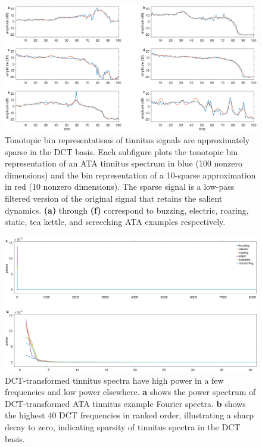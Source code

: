 \documentclass[journal]{IEEEtran}
\begin{document}
\begin{figure}[h]
	\centering
	\includegraphics[width=\linewidth]{gfx/target_signal_sparsity_2.eps}
	\caption{Tonotopic bin representations of tinnitus signals are approximately sparse
    in the DCT basis.
    Each subfigure plots the tonotopic bin representation of an ATA tinnitus spectrum
    in blue (100 nonzero dimensions) and the bin representation of a 10-sparse
    approximation in red (10 nonzero dimensions).
    The sparse signal is a low-pass filtered version of the original signal
    that retains the salient dynamics.
    \textbf{(a)} through \textbf{(f)} correspond to
    buzzing, electric, roaring, static, tea kettle, and screeching ATA examples
    respectively.}
	\label{fig:target_signal_sparsity_2}
\end{figure}

\begin{figure}[h]
	\centering
	\includegraphics[width=\linewidth]{gfx/target_signal_sparsity_3.eps}
	\caption{DCT-transformed tinnitus spectra have high power in a few frequencies
  and low power elsewhere. \textbf{a} shows the power spectrum of DCT-transformed
  ATA tinnitus example Fourier spectra. \textbf{b} shows the highest 40 DCT frequencies
  in ranked order, illustrating a sharp decay to zero, indicating sparsity
  of tinnitus spectra in the DCT basis.}
	\label{fig:target_signal_sparsity_3}
\end{figure}

\FloatBarrier




\end{document}
